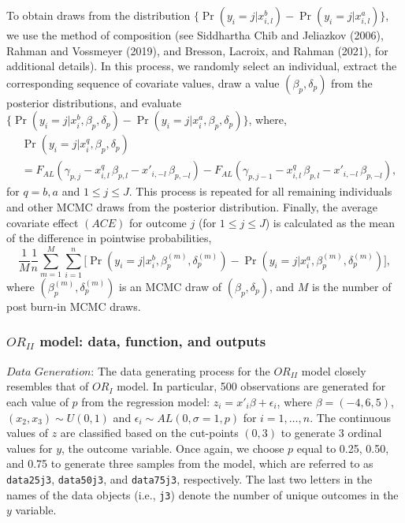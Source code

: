 To obtain draws from the distribution \(\{\Pr(y_{i}=j|x_{i,l}^{b}) - \Pr(y_{i}=j|x_{i,l}^{a} ) \}\), we use the method of composition (see Siddhartha Chib and Jeliazkov (2006), Rahman and Vossmeyer (2019), and Bresson, Lacroix, and Rahman (2021), for additional details). In this process, we randomly select an individual, extract the corresponding sequence of covariate values, draw a value \((\beta_{p}, \delta_{p})\) from the posterior distributions, and evaluate \(\{\Pr(y_{i}=j|x_{i}^{b},\beta_{p},\delta_{p}) - \Pr(y_{i}=j|x_{i}^{a},\beta_{p},\delta_{p} )\}\), where,
\begin{equation*}
\begin{split}
& \Pr(y_{i}=j|x_{i}^{q},\beta_{p},\delta_{p}) \\
& = F_{AL}(\gamma_{p,j} - x_{i,l}^{q} \, \beta_{p,l} - x'_{i,-l} \, \beta_{p,-l}) - F_{AL}(\gamma_{p,j-1} - x_{i,l}^{q} \, \beta_{p,l} - x'_{i,-l} \, \beta_{p,-l}),
\end{split}
\end{equation*}
for \(q=b, a\) and \(1 \le j \le J\). This process is repeated for all remaining individuals and other MCMC draws from the posterior distribution. Finally, the average covariate effect \((ACE)\) for outcome \(j\) (for \(1 \le j \le J\)) is calculated as the mean of the difference in pointwise probabilities,
\begin{equation}
\frac{1}{M} \frac{1}{n} \sum_{m=1}^{M}
\sum_{i=1}^{n} \Big[ \Pr(y_{i}=j|x_{i}^{b},\beta_{p}^{(m)},\delta_{p}^{(m)}) - \Pr(y_{i}=j|x_{i}^{a},\beta_{p}^{(m)},\delta_{p}^{(m)} ) \Big],
\label{eq:ACEOR1}
\end{equation}
where \((\beta_{p}^{(m)},\delta_{p}^{(m)})\) is an MCMC draw of \((\beta_{p}, \delta_{p})\), and \(M\) is the number of post burn-in MCMC draws.

\hypertarget{subsec:SimDataORII}{%
\subsubsection{\texorpdfstring{\(OR_{II}\) model: data, function, and outputs}{OR\_\{II\} model: data, function, and outputs}}\label{subsec:SimDataORII}}

\(\textit{Data Generation}\): The data generating process for the \(OR_{II}\) model closely resembles that of \(OR_{I}\) model. In particular, 500 observations are generated for each value of \(p\) from the regression model: \(z_{i} = x'_{i}\beta + \epsilon_{i}\), where \(\beta = (-4, 6, 5)\), \((x_{2},x_{3}) \sim U(0, 1)\) and \(\epsilon_{i} \sim AL(0, \sigma = 1, p)\) for \(i=1,\ldots,n\). The continuous values of \(z\) are classified based on the cut-points \((0, 3)\) to generate 3 ordinal values for \(y\), the outcome variable. Once again, we choose \(p\) equal to 0.25, 0.50, and 0.75 to generate three samples from the model, which are referred to as \texttt{data25j3}, \texttt{data50j3}, and \texttt{data75j3}, respectively. The last two letters in the names of the data objects (i.e., \texttt{j3}) denote the number of unique outcomes in the \(y\) variable.

